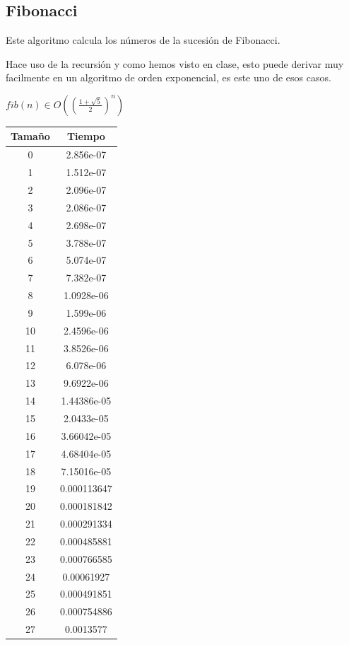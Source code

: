 \documentclass{article}
\begin{document}
\subsection{Fibonacci}
Este algoritmo calcula los números de la sucesión de Fibonacci. 
\

Hace uso de la recursión y como hemos visto en clase, esto puede derivar muy facilmente en un algoritmo de orden exponencial, es este uno de esos casos.
\

$fib(n) \in O((\frac{1+\sqrt5}{2})^n)$

\begin{longtable}{|c||c|}
	\hline
	Tamaño & Tiempo  \\ \hline
	0   & 2.856e-07  \\ \hline
	1   & 1.512e-07  \\ \hline
	2   & 2.096e-07  \\ \hline
	3   & 2.086e-07  \\ \hline
	4   & 2.698e-07  \\ \hline
	5   & 3.788e-07  \\ \hline
	6   & 5.074e-07  \\ \hline
	7   & 7.382e-07  \\ \hline
	8   & 1.0928e-06  \\ \hline
	9   & 1.599e-06  \\ \hline
	10  &  2.4596e-06  \\ \hline
	11  &  3.8526e-06  \\ \hline
	12  &  6.078e-06  \\ \hline
	13  &  9.6922e-06  \\ \hline
	14  &  1.44386e-05  \\ \hline
	15  &  2.0433e-05  \\ \hline
	16  &  3.66042e-05  \\ \hline
	17  &  4.68404e-05  \\ \hline
	18  &  7.15016e-05  \\ \hline
	19  &  0.000113647  \\ \hline
	20  &  0.000181842  \\ \hline
	21  &  0.000291334  \\ \hline
	22  &  0.000485881  \\ \hline
	23  &  0.000766585  \\ \hline
	24  &  0.00061927  \\ \hline
	25  &  0.000491851  \\ \hline
	26  &  0.000754886  \\ \hline
	27  &  0.0013577  \\ \hline

\end{longtable}
\end{document}
